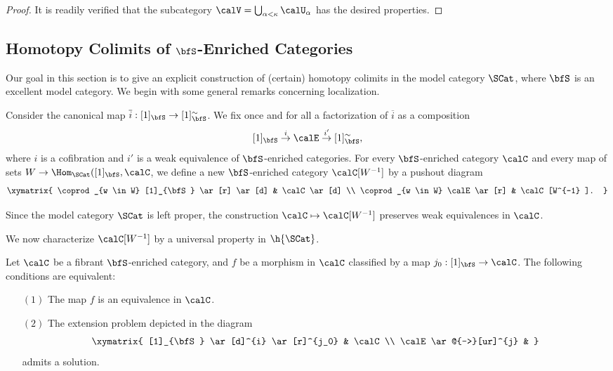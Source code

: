 \begin{Simplicial Categories}
\begin{proof}
It is readily verified that the subcategory $\calV = \bigcup_{\alpha < \kappa} \calU_{\alpha}$
has the desired properties.
\end{proof}

\subsection{Homotopy Colimits of $\bfS$-Enriched Categories}\label{hoco}

Our goal in this section is to give an explicit construction of (certain) homotopy colimits
in the model category $\SCat$, where $\bfS$ is an excellent model category. We begin
with some general remarks concerning localization.

\begin{notation}\label{localdef}
Consider the canonical map $\overline{i}: [1]_{\bfS} \rightarrow [1]^{\sim}_{\bfS}$. We
fix once and for all a factorization of $\overline{i}$ as a composition
$$ [1]_{\bfS} \stackrel{i}{\rightarrow} \calE \stackrel{i'}{\rightarrow} [1]_{\bfS}^{\sim},$$
where $i$ is a cofibration and $i'$ is a weak equivalence of $\bfS$-enriched categories.
For every $\bfS$-enriched category $\calC$ and every map of sets
$W \rightarrow \Hom_{\SCat}( [1]_{\bfS}, \calC$, we define a new $\bfS$-enriched
category $\calC[W^{-1}]$ by a pushout diagram
$$ \xymatrix{ \coprod_{w \in W} [1]_{\bfS} \ar[r] \ar[d] & \calC \ar[d] \\
\coprod_{w \in W} \calE \ar[r] & \calC[W^{-1} ]. }$$
\end{notation}

\begin{remark}\label{summat}
Since the model category $\SCat$ is left proper, the construction
$\calC \mapsto \calC[W^{-1}]$ preserves weak equivalences in $\calC$.
\end{remark}

We now characterize $\calC[W^{-1}]$ by a universal property in $\h{\SCat}$.

\begin{lemma}\label{pufft}
Let $\calC$ be a fibrant $\bfS$-enriched category, and 
$f$ be a morphism in $\calC$ classified by a map $j_0: [1]_{\bfS} \rightarrow \calC$.
The following conditions are equivalent:
\begin{itemize}
\item[$(1)$] The map $f$ is an equivalence in $\calC$.
\item[$(2)$] The extension problem depicted in the diagram
$$ \xymatrix{ [1]_{\bfS} \ar[d]^{i} \ar[r]^{j_0} & \calC \\
\calE \ar@{-->}[ur]^{j} & }$$
admits a solution.
\end{itemize}
\end{lemma}


\end{Simplicial Categories}
